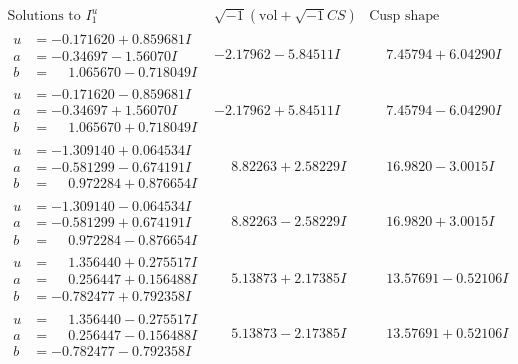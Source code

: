\documentclass[1p]{elsarticle_modified}
\theoremstyle{definition}
\newcommand{\I}{\sqrt{-1}}
\begin{document}
$$\begin{array}{c|c|c}  
\text{Solutions to }I^u_{1}& \I (\text{vol} + \sqrt{-1}CS) & \text{Cusp shape}\\
 \hline 
\begin{aligned}
u &= -0.171620 + 0.859681 I \\
a &= -0.34697 - 1.56070 I \\
b &= \phantom{-}1.065670 - 0.718049 I\end{aligned}
 & -2.17962 - 5.84511 I & \phantom{-}7.45794 + 6.04290 I \\ \hline\begin{aligned}
u &= -0.171620 - 0.859681 I \\
a &= -0.34697 + 1.56070 I \\
b &= \phantom{-}1.065670 + 0.718049 I\end{aligned}
 & -2.17962 + 5.84511 I & \phantom{-}7.45794 - 6.04290 I \\ \hline\begin{aligned}
u &= -1.309140 + 0.064534 I \\
a &= -0.581299 - 0.674191 I \\
b &= \phantom{-}0.972284 + 0.876654 I\end{aligned}
 & \phantom{-}8.82263 + 2.58229 I & \phantom{-}16.9820 - 3.0015 I \\ \hline\begin{aligned}
u &= -1.309140 - 0.064534 I \\
a &= -0.581299 + 0.674191 I \\
b &= \phantom{-}0.972284 - 0.876654 I\end{aligned}
 & \phantom{-}8.82263 - 2.58229 I & \phantom{-}16.9820 + 3.0015 I \\ \hline\begin{aligned}
u &= \phantom{-}1.356440 + 0.275517 I \\
a &= \phantom{-}0.256447 + 0.156488 I \\
b &= -0.782477 + 0.792358 I\end{aligned}
 & \phantom{-}5.13873 + 2.17385 I & \phantom{-}13.57691 - 0.52106 I \\ \hline\begin{aligned}
u &= \phantom{-}1.356440 - 0.275517 I \\
a &= \phantom{-}0.256447 - 0.156488 I \\
b &= -0.782477 - 0.792358 I\end{aligned}
 & \phantom{-}5.13873 - 2.17385 I & \phantom{-}13.57691 + 0.52106 I \\ \hline\begin{aligned}

\end{aligned}
\end{array}$$
\end{document}
